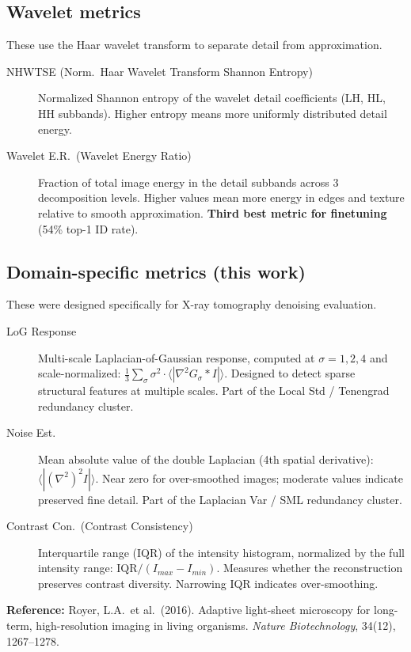 \documentclass[11pt]{article}
\begin{document}
\subsection*{Wavelet metrics}
These use the Haar wavelet transform to separate detail from approximation.
\begin{description}
\item[NHWTSE (Norm.\ Haar Wavelet Transform Shannon Entropy)] Normalized Shannon entropy of the wavelet detail coefficients (LH, HL, HH subbands). Higher entropy means more uniformly distributed detail energy.
\item[Wavelet E.R.\ (Wavelet Energy Ratio)] Fraction of total image energy in the detail subbands across 3 decomposition levels. Higher values mean more energy in edges and texture relative to smooth approximation. \textbf{Third best metric for finetuning} (54\% top-1 ID rate).
\end{description}

\subsection*{Domain-specific metrics (this work)}
These were designed specifically for X-ray tomography denoising evaluation.
\begin{description}
\item[LoG Response] Multi-scale Laplacian-of-Gaussian response, computed at $\sigma = 1, 2, 4$ and scale-normalized: $\frac{1}{3}\sum_\sigma \sigma^2 \cdot \langle |\nabla^2 G_\sigma * I| \rangle$. Designed to detect sparse structural features at multiple scales. Part of the Local Std / Tenengrad redundancy cluster.
\item[Noise Est.] Mean absolute value of the double Laplacian (4th spatial derivative): $\langle |(\nabla^2)^2 I| \rangle$. Near zero for over-smoothed images; moderate values indicate preserved fine detail. Part of the Laplacian Var / SML redundancy cluster.
\item[Contrast Con.\ (Contrast Consistency)] Interquartile range (IQR) of the intensity histogram, normalized by the full intensity range: $\mathrm{IQR} / (I_{max} - I_{min})$. Measures whether the reconstruction preserves contrast diversity. Narrowing IQR indicates over-smoothing.
\end{description}

\vspace{1em}
\noindent\textbf{Reference:} Royer, L.A.\ et al.\ (2016). Adaptive light-sheet microscopy for long-term, high-resolution imaging in living organisms. \textit{Nature Biotechnology}, 34(12), 1267--1278.
\end{document}
